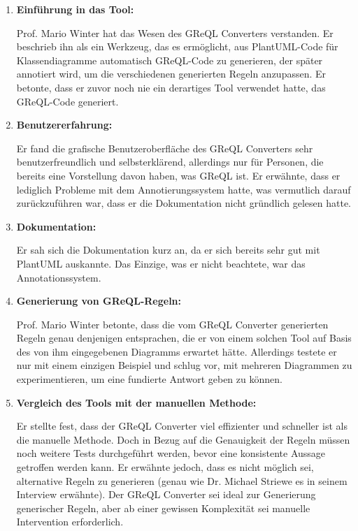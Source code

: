 \begin{enumerate}[itemsep=8pt, parsep=5pt]
    \item \textbf{Einführung in das Tool:}

    Prof. Mario Winter hat das Wesen des GReQL Converters verstanden. Er beschrieb ihn als ein Werkzeug, das es
    ermöglicht, aus PlantUML-Code für Klassendiagramme automatisch GReQL-Code zu generieren, der später annotiert wird,
    um die verschiedenen generierten Regeln anzupassen. Er betonte, dass er zuvor noch nie ein derartiges Tool
    verwendet hatte, das GReQL-Code generiert.


    \item \textbf{Benutzererfahrung:}

    Er fand die grafische Benutzeroberfläche des GReQL Converters sehr benutzerfreundlich und selbsterklärend,
    allerdings nur für Personen, die bereits eine Vorstellung davon haben, was GReQL ist. Er erwähnte, dass er
    lediglich Probleme mit dem Annotierungssystem hatte, was vermutlich darauf zurückzuführen war, dass er die
    Dokumentation nicht gründlich gelesen hatte.

    \item \textbf{Dokumentation:}

    Er sah sich die Dokumentation kurz an, da er sich bereits sehr gut mit PlantUML auskannte. Das Einzige, was er
    nicht beachtete, war das Annotationssystem.

    \item \textbf{Generierung von GReQL-Regeln:}

    Prof. Mario Winter betonte, dass die vom GReQL Converter generierten Regeln genau denjenigen entsprachen, die er
    von einem solchen Tool auf Basis des von ihm eingegebenen Diagramms erwartet hätte. Allerdings testete er nur mit
    einem einzigen Beispiel und schlug vor, mit mehreren Diagrammen zu experimentieren, um eine fundierte Antwort geben
    zu können.

    \item \textbf{Vergleich des Tools mit der manuellen Methode:}

    Er stellte fest, dass der GReQL Converter viel effizienter und schneller ist als die manuelle Methode. Doch in Bezug
    auf die Genauigkeit der Regeln müssen noch weitere Tests durchgeführt werden, bevor eine konsistente Aussage
    getroffen werden kann. Er erwähnte jedoch, dass es nicht möglich sei, alternative Regeln zu generieren
    (genau wie Dr. Michael Striewe es in seinem Interview erwähnte). Der GReQL Converter sei ideal zur Generierung
    generischer Regeln, aber ab einer gewissen Komplexität sei manuelle Intervention erforderlich.


\end{enumerate}

